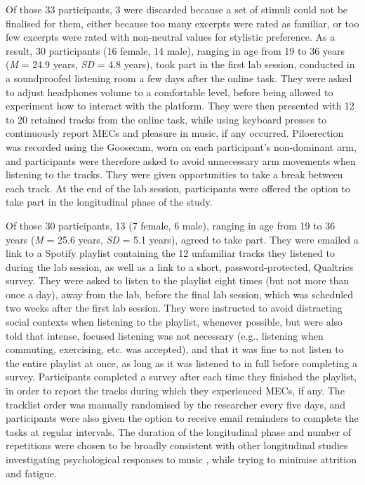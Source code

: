 Of those 33 participants, 3 were discarded because a set of stimuli could not be finalised for them, either because too many excerpts were rated as familiar, or too few excerpts were rated with non-neutral values for stylistic preference. As a result, 30 participants (16 female, 14 male), ranging in age from 19 to 36 years (\emph{M} = 24.9 years, \emph{SD} = 4.8 years), took part in the first lab session, conducted in a soundproofed listening room a few days after the online task. They were asked to adjust headphones volume to a comfortable level, before being allowed to experiment how to interact with the platform. They were then presented with 12 to 20 retained tracks from the online task, while using keyboard presses to continuously report MECs and pleasure in music, if any occurred. Piloerection was recorded using the Goosecam, worn on each participant's non-dominant arm, and participants were therefore asked to avoid unnecessary arm movements when listening to the tracks. They were given opportunities to take a break between each track. At the end of the lab session, participants were offered the option to take part in the longitudinal phase of the study.

Of those 30 participants, 13 (7 female, 6 male), ranging in age from 19 to 36 years (\emph{M} = 25.6 years, \emph{SD} = 5.1 years), agreed to take part. They were emailed a link to a Spotify playlist containing the 12 unfamiliar tracks they listened to during the lab session, as well as a link to a short, password-protected, Qualtrics survey. They were asked to listen to the playlist eight times (but not more than once a day), away from the lab, before the final lab session, which was scheduled two weeks after the first lab session. They were instructed to avoid distracting social contexts when listening to the playlist, whenever possible, but were also told that intense, focused listening was not necessary (e.g., listening when commuting, exercising, etc. was accepted), and that it was fine to not listen to the entire playlist at once, as long as it was listened to in full before completing a survey. Participants completed a survey after each time they finished the playlist, in order to report the tracks during which they experienced MECs, if any. The tracklist order was manually randomised by the researcher every five days, and participants were also given the option to receive email reminders to complete the tasks at regular intervals. The duration of the longitudinal phase and number of repetitions were chosen to be broadly consistent with other longitudinal studies investigating psychological responses to music \parencite{chmiel2019,grewe2007,madison2017}, while trying to minimise attrition and fatigue.

